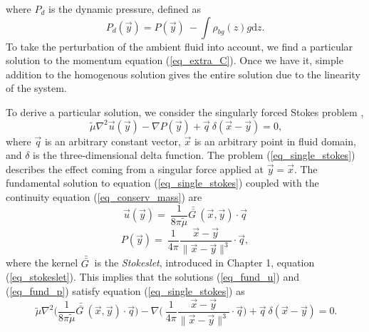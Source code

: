 	where $P_d$ is the dynamic pressure, defined as
\begin{equation}
	P_d (\vec{y})
	 = P (\vec{y}) \ - \int \rho_{bg}(z) g   \textrm{d}z.
	\label{eq_Pd}
\end{equation}
To take the perturbation of the ambient fluid into account, we find a particular solution to the momentum equation (\ref{eq_extra_C}). Once we have it, simple addition to the homogenous solution gives the entire solution due to the linearity of the system. 
\par
To derive a particular solution, we consider the singularly forced Stokes problem \cite{pozrikidis_boundary_1992},
\begin{equation}
	\ \tilde{\mu} \nabla^2 \vec{u}(\vec{y})
	- \nabla P (\vec{y})
	+\vec{q} \ \delta \left(\vec{x} - \vec{y} \right) =0,
\label{eq_single_stokes}
\end{equation}
where $\vec{q}$ is an arbitrary constant vector, $\vec{x}$ is an arbitrary point in fluid domain, and $\delta$ is the three-dimensional delta function.
The problem (\ref{eq_single_stokes}) 
describes the effect coming from a singular force applied at $\vec{y} = \vec{x}.$
The fundamental solution to equation (\ref{eq_single_stokes}) coupled with the continuity equation (\ref{eq_conserv_mass}) are
\begin{equation}
	\vec{u} (\vec{y}) = \ \frac{1}{8\pi \tilde{\mu}}  \bar{\bar{G \ }}(\vec{x}, \vec{y})
	\cdot  \vec{q}
\label{eq_fund_u}
\end{equation}
\begin{equation}
	P (\vec{y}) = \ \frac{1}{4\pi }  
	\frac{\vec{x} - \vec{y}}{\| \vec{x} - \vec{y}\|^3}
	\cdot  \vec{q},
\label{eq_fund_p}
\end{equation}
where the kernel $\bar{\bar{G \ }}$ is the \textit{Stokeslet}, introduced in Chapter 1, equation (\ref{eq_stokeslet}).
This implies that the solutions (\ref{eq_fund_u}) and (\ref{eq_fund_p}) satisfy equation (\ref{eq_single_stokes}) as
\begin{equation}
	\ \tilde{\mu} \nabla^2 
	\biggl( \frac{1}{8\pi \tilde{\mu}}  \bar{\bar{G \ }}(\vec{x}, \vec{y})
	\cdot  \vec{q} \biggr)
	- \nabla \biggl(\ \frac{1}{4\pi }  
	\frac{\vec{x} - \vec{y}}{\| \vec{x} - \vec{y}\|^3}
	\cdot  \vec{q} \biggr)
	+ \vec{q} \ \delta \left(\vec{x} - \vec{y} \right)
	=0.
\label{eq_single_stokes_sub}
\end{equation}
